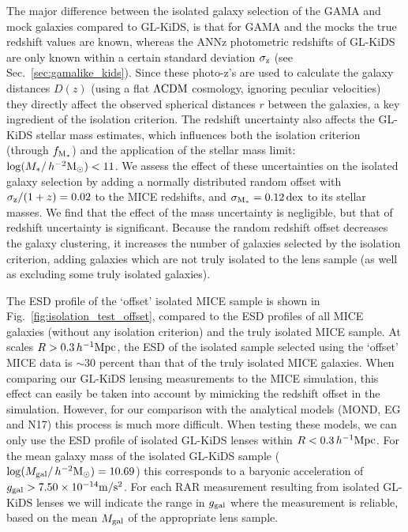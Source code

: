 \documentclass[usenatbib]{mnras}
\newcommand{\hmsun}{\,h^{-2} {\rm M_\odot}}
\newcommand{\hMpc}{\, h^{-1}{\rm{Mpc}} }
\newcommand{\mpss}{ {\rm m/s^2} }
\newcommand{\lcdm}{{\rm \Lambda CDM}}
\newcommand*{\E}[1]{\times 10^{#1}}
\newcommand{\un}[1]{_{\rm #1}}
\newcommand{\dex}{\, {\rm dex}}
\begin{document}
The major difference between the isolated galaxy selection of the GAMA and mock galaxies compared to GL-KiDS, is that for GAMA and the mocks the true redshift values are known, whereas the ANNz photometric redshifts of GL-KiDS are only known within a certain standard deviation $\sigma\un{z}$ (see Sec.~\ref{sec:gamalike_kids}). Since these photo-z's are used to calculate the galaxy distances $D(z)$ (using a flat $\lcdm$ cosmology, ignoring peculiar velocities) they directly affect the observed spherical distances $r$ between the galaxies, a key ingredient of the isolation criterion. The redshift uncertainty also affects the GL-KiDS stellar mass estimates, which influences both the isolation criterion (through $f\un{M_*}$) and the application of the stellar mass limit: $\log(M_*/\hmsun) < 11$. We assess the effect of these uncertainties on the isolated galaxy selection by adding a normally distributed random offset with $\sigma\un{z}/(1+z) = 0.02$ to the MICE redshifts, and $\sigma\un{M_*} = 0.12 \dex$ to its stellar masses. We find that the effect of the mass uncertainty is negligible, but that of redshift uncertainty is significant. Because the random redshift offset decreases the galaxy clustering, it increases the number of galaxies selected by the isolation criterion, adding galaxies which are not truly isolated to the lens sample (as well as excluding some truly isolated galaxies). %

The ESD profile of the `offset' isolated MICE sample is shown in Fig.~\ref{fig:isolation_test_offset}, compared to the ESD profiles of all MICE galaxies (without any isolation criterion) and the truly isolated MICE sample. At scales $R > 0.3 \hMpc$, the ESD of the isolated sample selected using the `offset' MICE data is $\sim 30$ percent than that of the truly isolated MICE galaxies. When comparing our GL-KiDS lensing measurements to the MICE simulation, this effect can easily be taken into account by mimicking the redshift offset in the simulation. However, for our comparison with the analytical models (MOND, EG and N17) this process is much more difficult. When testing these models, we can only use the ESD profile of isolated GL-KiDS lenses within $R < 0.3 \hMpc$. For the mean galaxy mass of the isolated GL-KiDS sample ($\log(M\un{gal}/\hmsun) = 10.69$) this corresponds to a baryonic acceleration of $g\un{gal}>7.50\E{-14} \mpss$. For each RAR measurement resulting from isolated GL-KiDS lenses we will indicate the range in $g\un{gal}$ where the measurement is reliable, based on the mean $M\un{gal}$ of the appropriate lens sample.
\end{document}
